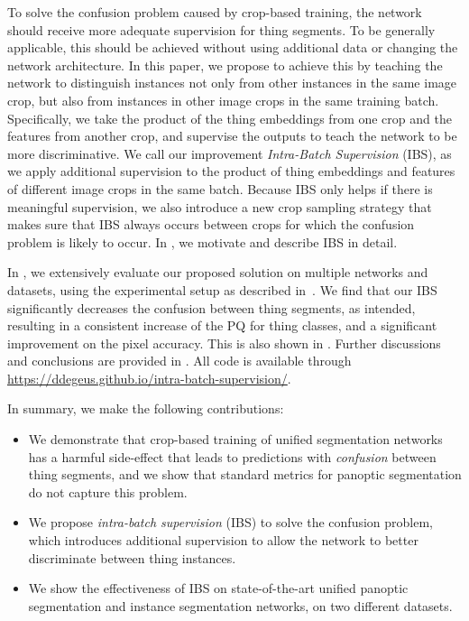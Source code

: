 \documentclass[10pt,twocolumn,letterpaper]{article}
\begin{document}
To solve the confusion problem caused by crop-based training, the network should receive more adequate supervision for thing segments.
To be generally applicable, this should be achieved without using additional data or changing the network architecture. In this paper, we propose to achieve this by teaching the network to distinguish instances not only from other instances in the same image crop, but also from instances in other image crops in the same training batch. Specifically, we take the product of the thing embeddings from one crop and the features from another crop, and supervise the outputs to teach the network to be more discriminative.
We call our improvement \textit{Intra-Batch Supervision} (IBS), as we apply additional supervision to the product of thing embeddings and features of different image crops in the same batch. Because IBS only helps if there is meaningful supervision, we also introduce a new crop sampling strategy that makes sure that IBS always occurs between crops for which the confusion problem is likely to occur. In , we motivate and describe IBS in detail.


In , we extensively evaluate our proposed solution on multiple networks and datasets, using the experimental setup as described in~. We find that our IBS significantly decreases the confusion between thing segments, as intended, resulting in a consistent increase of the PQ for thing classes, and a significant improvement on the pixel accuracy. This is also shown in . Further discussions and conclusions are provided in . All code is available through \url{https://ddegeus.github.io/intra-batch-supervision/}.

In summary, we make the following contributions:
\begin{itemize}
    \item We demonstrate that crop-based training of unified segmentation networks has a harmful side-effect that leads to predictions with \textit{confusion} between thing segments, and we show that standard metrics for panoptic segmentation do not capture this problem.
    \item We propose \textit{intra-batch supervision} (IBS) to solve the confusion problem, which introduces additional supervision to allow the network to better discriminate between thing instances.
    \item We show the effectiveness of IBS on state-of-the-art unified panoptic segmentation and instance segmentation networks, on two different datasets.
\end{itemize}
\end{document}
